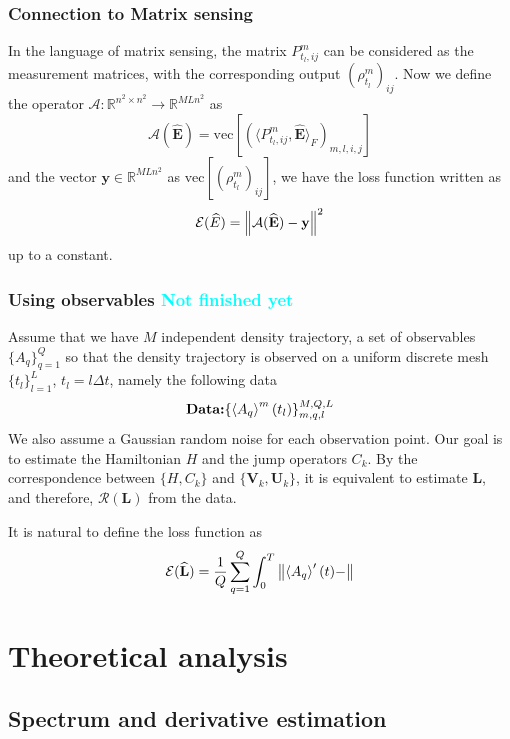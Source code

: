 \documentclass[10pt]{article}  %
\theoremstyle{plain}
\numberwithin{equation}{section}
\newcommand{\innerp}[1]{\langle{#1}\rangle}
\def\mE{\mathcal{E}}
\def\mA{\mathcal{A}}
\def\mR{\mathcal{R}}
\def\R{\mathbb{R}}
\newcommand{\bL}{\mathbf{L}}
\newcommand{\bV}{\mathbf{V}}
\newcommand{\bU}{\mathbf{U}}
\newcommand{\bE}{\mathbf{E}}
\newcommand{\by}{\mathbf{y}}
\renewcommand{\vec}{\text{vec}}
\newcommand{\QL}[1]{\textcolor{cyan}{{#1}}}
\begin{document}
\subsubsection{Connection to Matrix sensing}
In the language of matrix sensing, the matrix $P^m_{t_l, ij}$ can be considered as the measurement matrices, with the corresponding output $(\rho^m_{t_l})_{ij}$. Now we define the operator $\mA : \R^{n^2\times n^2}\to \R^{MLn^2}$ as
\begin{equation}
	\mA(\widehat{\bE}) = \vec\left[(\innerp{P^m_{t_l, ij}, \widehat{\bE}}_F)_{m, l, i, j}\right]
\end{equation}
and the vector $\by\in \R^{MLn^2}$ as $\vec\left[(\rho^m_{t_l})_{ij}\right]$, we have the loss function written as 
\begin{equation}
	\mE(\widehat{E}) = \norm{\mA(\widehat{\bE}) - \by}^2
\end{equation}
up to a constant. 

\subsubsection{Using observables \QL{Not finished yet}}
Assume that we have $M$ independent density trajectory, a set of observables $\{A_q\}_{q = 1}^Q$ so that the density trajectory is observed on a uniform discrete mesh $\{t_l\}_{l = 1}^L$, $t_l = l \Delta t$, namely the following data
\begin{equation}
	\textbf{Data:} \{\expval{A_q}^m (t_l)\}_{m, q, l}^{M, Q, L}
\end{equation}
We also assume a Gaussian random noise for each observation point. Our goal is to estimate the Hamiltonian $H$ and the jump operators $C_k$. By the correspondence between $\{H, C_k\}$ and $\{\bV_k, \bU_k\}$, it is equivalent to estimate $\bL$, and therefore, $\mR(\bL)$ from the data. 

It is natural to define the loss function as 
\begin{equation}
	\mE(\widehat{\bL}) = \frac{1}{Q}\sum_{q = 1}^Q\int_0^T \norm{\expval{A_q}'(t) - }
\end{equation}


\section{Theoretical analysis}

\subsection{Spectrum and derivative estimation}
\end{document}
